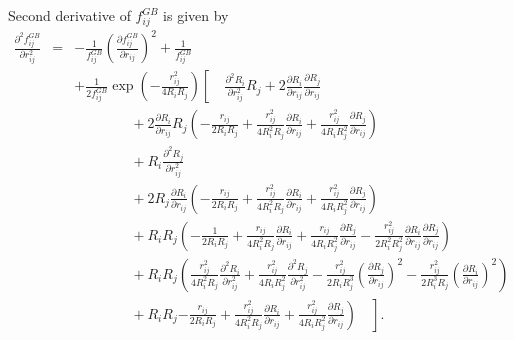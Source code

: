 \documentclass[12pt]{article}
\begin{document}
Second derivative of $f_{ij}^{GB}$ is given by
\begin{eqnarray}
\label{eq:fGB2ndDerv1}
\frac{\partial^{2}f_{ij}^{GB}}{\partial r_{ij}^{2}} & = & -\frac{1}{f_{ij}^{GB}}\left(\frac{\partial f_{ij}^{GB}}{\partial r_{ij}}\right)^{2} +  \frac{1}{f_{ij}^{GB}} \nonumber \\
& & + \frac{1}{2f_{ij}^{GB}}\exp\left(-\frac{r_{ij}^2}{4R_{i}R_{j}}\right)\left[\quad \frac{\partial^{2} R_{i}}{\partial r_{ij}^2}R_{j} + 2\frac{\partial R_{i}}{\partial r_{ij}}\frac{\partial R_{j}}{\partial r_{ij}} \right. \nonumber \\
& & \qquad\qquad + 2 \frac{\partial R_{i}}{\partial r_{ij}}R_{j}\left(- \frac{r_{ij}}{2R_{i}R_{j}} + \frac{r_{ij}^{2}}{4R_{i}^{2}R_{j}}\frac{\partial R_{i}}{\partial r_{ij}} + \frac{r_{ij}^{2}}{4R_{i}R_{j}^{2}}\frac{\partial R_{j}}{\partial r_{ij}} \right) \nonumber \\
& &  \qquad\qquad + R_{i}\frac{\partial^{2} R_{j}}{\partial r_{ij}^2} \nonumber \\
& &  \qquad\qquad + 2R_{j}\frac{\partial R_{i}}{\partial r_{ij}}\left(-\frac{r_{ij}}{2R_{i}R_{j}} + \frac{r_{ij}^2}{4R_{i}^{2}R_{j}}\frac{\partial R_{i}}{\partial r_{ij}} + \frac{r_{ij}^2}{4R_{i}R_{j}^{2}}\frac{\partial R_{j}}{\partial r_{ij}}  \right) \nonumber \\
& &  \qquad\qquad + R_{i}R_{j}\left(-\frac{1}{2R_{i}R_{j}} + \frac{r_{ij}}{4R_{i}^{2}R_{j}}\frac{\partial R_{i}}{\partial r_{ij}} + \frac{r_{ij}}{4R_{i}R_{j}^{2}}\frac{\partial R_{j}}{\partial r_{ij}}-\frac{r_{ij}^{2}}{2R_{i}^{2}R_{j}^{2}}\frac{\partial R_{i}}{\partial r_{ij}}\frac{\partial R_{j}}{\partial r_{ij}} \right)  \nonumber \\
& &  \qquad\qquad + R_{i}R_{j}\left(\frac{r_{ij}^{2}}{4R_{i}^{2}R_{j}}\frac{\partial^{2}R_{i}}{\partial r_{ij}^2} + \frac{r_{ij}^{2}}{4R_{i}R_{j}^{2}}\frac{\partial^{2}R_{j}}{\partial r_{ij}^2} - \frac{r_{ij}^{2}}{2R_{i}R_{j}^{3}}\left(\frac{\partial R_{j}}{\partial r_{ij}}\right)^{2}  - \frac{r_{ij}^{2}}{2R_{i}^{3}R_{j}}\left(\frac{\partial R_{i}}{\partial r_{ij}}\right)^{2}    \right) \nonumber \\
& &  \qquad\qquad + \left. R_{i}R_{j}\left.-\frac{r_{ij}}{2R_{i}R_{j}} + \frac{r_{ij}^{2}}{4R_{i}^{2}R_{j}}\frac{\partial R_{i}}{\partial r_{ij}} + \frac{r_{ij}^{2}}{4R_{i}R_{j}^{2}}\frac{\partial R_{j}}{\partial r_{ij}} \right) \quad \right].
\end{eqnarray}
\end{document}
